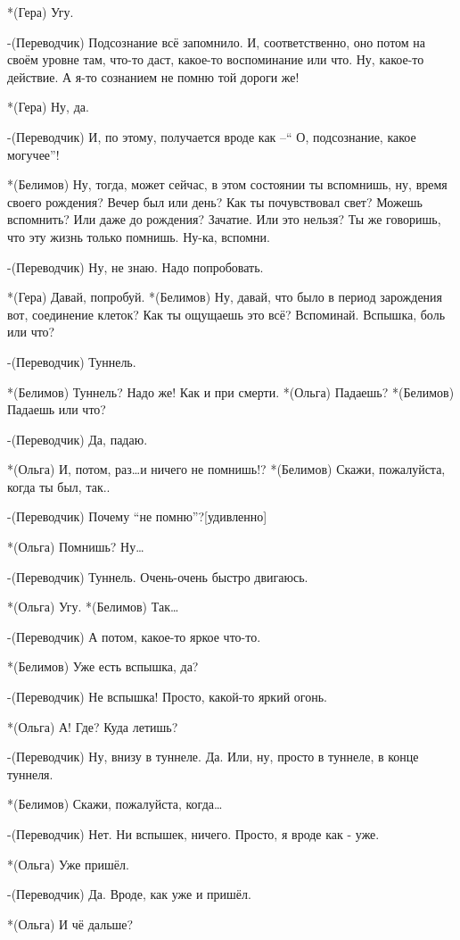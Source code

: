 *(Гера) Угу.

-(Переводчик) Подсознание всё запомнило. И, соответственно, оно потом на своём уровне там, что-то даст, какое-то воспоминание или что. Ну, какое-то действие. А  я-то сознанием  не помню той дороги же!

*(Гера) Ну, да.

-(Переводчик) И, по этому, получается вроде как –“ О, подсознание, какое могучее”! 

*(Белимов) Ну, тогда, может сейчас, в этом состоянии ты вспомнишь, ну, время своего рождения? Вечер был или день? Как ты почувствовал свет? Можешь вспомнить? Или даже до рождения? Зачатие. Или это нельзя? Ты же говоришь, что эту жизнь только помнишь. Ну-ка, вспомни.

-(Переводчик) Ну, не знаю.  Надо попробовать. 

*(Гера) Давай, попробуй.
*(Белимов) Ну, давай, что было в период зарождения вот, соединение клеток? Как ты ощущаешь это всё? Вспоминай. Вспышка, боль или что?

-(Переводчик) Туннель.

*(Белимов) Туннель? Надо же! Как и при смерти.
*(Ольга) Падаешь?
*(Белимов) Падаешь или что?

-(Переводчик) Да, падаю.

*(Ольга) И, потом, раз…и ничего не помнишь!?
*(Белимов) Скажи, пожалуйста, когда ты был, так.. 

-(Переводчик) Почему “не помню”?[удивленно]

*(Ольга) Помнишь? Ну…

-(Переводчик) Туннель. Очень-очень быстро двигаюсь.

*(Ольга) Угу.
*(Белимов) Так…

-(Переводчик) А потом, какое-то яркое что-то.

*(Белимов) Уже есть вспышка, да?

-(Переводчик) Не вспышка! Просто, какой-то яркий огонь.

*(Ольга) А! Где? Куда летишь?

-(Переводчик) Ну, внизу в туннеле. Да. Или, ну, просто в туннеле, в конце туннеля.

*(Белимов) Скажи, пожалуйста, когда…

-(Переводчик) Нет. Ни вспышек, ничего. Просто, я вроде как - уже.

*(Ольга) Уже пришёл.

-(Переводчик) Да. Вроде, как уже и пришёл.

*(Ольга) И чё дальше?

